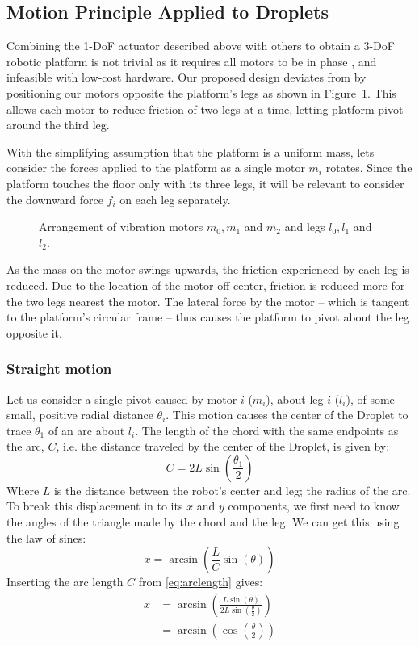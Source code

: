 \documentclass[letterpaper, 10pt, conference]{ieeeconf}
\begin{document}
\subsection{Motion Principle Applied to Droplets}
Combining the 1-DoF actuator described above with others to obtain a 3-DoF robotic platform is not trivial as it requires all motors to be in phase \cite{Vartholomeos2005}, and infeasible with low-cost hardware. Our proposed design deviates from \cite{Vartholomeos2005} by positioning our motors opposite the platform's legs as shown in Figure~\ref{dropletMotorDiagram}. This allows each motor to reduce friction of two legs at a time, letting platform pivot around the third leg. 

With the simplifying assumption that the platform is a uniform mass, lets consider the forces applied to the platform as a single motor $m_i$ rotates. Since the platform touches the floor only with its three legs, it will be relevant to consider the downward force $f_i$ on each leg separately.

\begin{figure}
\centering

\caption{Arrangement of vibration motors $m_0, m_1$ and $m_2$ and legs $l_0, l_1$ and $l_2$.}
\label{dropletMotorDiagram}
\end{figure}

As the mass on the motor swings upwards, the friction experienced by each leg is reduced. Due to the location of the motor off-center, friction is reduced more for the two legs nearest the motor. The lateral force by the motor -- which is tangent to the platform's circular frame -- thus causes the platform to pivot about the leg opposite it.



\subsubsection{Straight motion}

Let us consider a single pivot caused by motor $i$ ($m_i$), about leg $i$ ($l_i$), of some small, positive radial distance $\theta_i$. This motion causes the center of the Droplet to trace $\theta_1$ of an arc about $l_i$. The length of the chord with the same endpoints as the arc, $C$, i.e. the distance traveled by the center of the Droplet, is given by:
\begin{equation}\label{eq:arclength}
C=2 L \sin\left(\frac{\theta_1}{2}\right)
\end{equation}
Where $L$ is the distance between the robot's center and leg; the radius of the arc. To break this displacement in to its $x$ and $y$ components, we first need to know the angles of the triangle made by the chord and the leg. We can get this using the law of sines:
\begin{equation}
x = \arcsin\left(\frac{L}{C}\sin(\theta)\right) 
\end{equation}
Inserting the arc length $C$ from \ref{eq:arclength} gives:
\begin{align}
x &=\arcsin\left(\frac{L\sin(\theta)}{2 L \sin(\frac{\theta}{2})}\right) \\
\nonumber
   &=\arcsin\left(\cos\left(\frac{\theta}{2}\right)\right)
\end{align}
\end{document}
